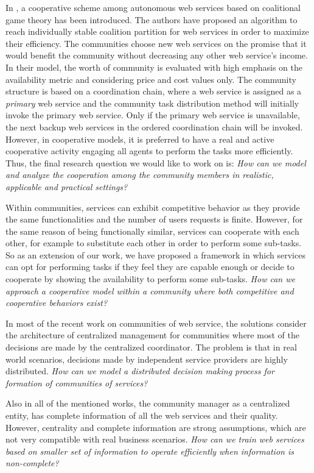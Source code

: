 In \cite{10.1109/TSC.2012.12}, a cooperative scheme among
autonomous web services based on coalitional game theory has been
introduced. The authors have proposed an algorithm to reach
individually stable coalition partition for web services in order
to maximize their efficiency. The communities choose new web
services on the promise that it would benefit the community
without decreasing any other web service's income. In their model,
the worth of community is evaluated with high emphasis on the
availability metric and considering price and cost values only.
The community structure is based on a coordination chain, where a
web service is assigned as a \emph{primary} web service and the
community task distribution method will initially invoke the
primary web service. Only if the primary web service is
unavailable, the next backup web services in the ordered
coordination chain will be invoked. However, in cooperative
models, it is preferred to have a real and active cooperative
activity engaging all agents to perform the tasks more
efficiently. Thus, the final research question we would like to
work on is: \emph{How can we model and analyze the cooperation
among the community members in realistic, applicable and practical
settings?}

Within communities, services can exhibit competitive behavior as they provide the same functionalities and the number of users requests is finite.
However, for the same reason of being functionally similar, services can cooperate with each other, for example to substitute each other in order to perform some sub-tasks.
So as an extension of our work, we have proposed a framework in which services can opt for performing tasks if they feel they are capable enough
or decide to cooperate by showing the availability to perform some sub-tasks. \emph{How can we approach a cooperative model within a community where both competitive and cooperative behaviors exist?}

In most of the recent work on communities of web service, the solutions consider the architecture of centralized management for communities where most of the decisions are made by the centralized coordinator. The problem is that in real world scenarios, decisions made by independent service providers are highly distributed.  \emph{How can we model a distributed decision making process for formation of communities of services?}

Also in all of the mentioned works, the community manager as a centralized entity, has complete information of all the web services and their quality. However, centrality and complete information are strong assumptions, which are not very compatible with real business scenarios.
\emph{How can we train web services based on smaller set of information to operate efficiently when information is non-complete?}

